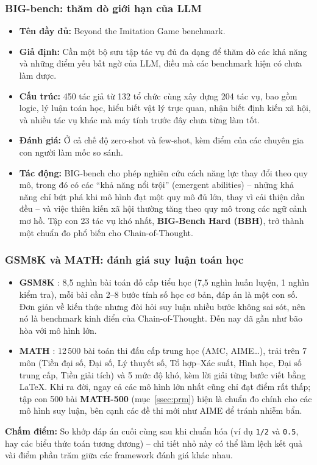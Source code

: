 \subsubsection{BIG-bench: thăm dò giới hạn của LLM}
\begin{itemize}
    \item \textbf{Tên đầy đủ:} Beyond the Imitation Game benchmark.
    \item \textbf{Giả định:} Cần một bộ sưu tập tác vụ đủ đa dạng để thăm dò các khả năng và những điểm yếu bất ngờ của LLM, điều mà các benchmark hiện có chưa làm được.
    \item \textbf{Cấu trúc:} 450 tác giả từ 132 tổ chức \cite{srivastava2023bigbench} cùng xây dựng 204 tác vụ, bao gồm logic, lý luận toán học, hiểu biết vật lý trực quan, nhận biết định kiến xã hội, và nhiều tác vụ khác mà máy tính trước đây chưa từng làm tốt.
    \item \textbf{Đánh giá:} Ở cả chế độ zero-shot và few-shot, kèm điểm của các chuyên gia con người làm mốc so sánh.
    \item \textbf{Tác động:} BIG-bench cho phép nghiên cứu cách năng lực thay đổi theo quy mô, trong đó có các “khả năng nổi trội” (emergent abilities) -- những khả năng chỉ bứt phá khi mô hình đạt một quy mô đủ lớn, thay vì cải thiện dần đều -- và việc thiên kiến xã hội thường tăng theo quy mô trong các ngữ cảnh mơ hồ. Tập con 23 tác vụ khó nhất, \textbf{BIG-Bench Hard (BBH)}, trở thành một chuẩn đo phổ biến cho Chain-of-Thought.
\end{itemize}

\subsubsection{GSM8K và MATH: đánh giá suy luận toán học}
\label{sssec:gsm8k_math}
\begin{itemize}
	\item \textbf{GSM8K} \cite{cobbe2021gsm8k}: 8{,}5 nghìn bài toán đố cấp tiểu học (7{,}5 nghìn huấn luyện, 1 nghìn kiểm tra), mỗi bài cần 2--8 bước tính số học cơ bản, đáp án là một con số. Đơn giản về kiến thức nhưng đòi hỏi suy luận nhiều bước không sai sót, nên nó là benchmark kinh điển của Chain-of-Thought. Đến nay đã gần như bão hòa với mô hình lớn.
	\item \textbf{MATH} \cite{hendrycks2021math}: 12\,500 bài toán thi đấu cấp trung học (AMC, AIME\ldots), trải trên 7 môn (Tiền đại số, Đại số, Lý thuyết số, Tổ hợp--Xác suất, Hình học, Đại số trung cấp, Tiền giải tích) và 5 mức độ khó, kèm lời giải từng bước viết bằng \LaTeX. Khi ra đời, ngay cả các mô hình lớn nhất cũng chỉ đạt điểm rất thấp; tập con 500 bài \textbf{MATH-500} (mục~\ref{ssec:prm}) hiện là chuẩn đo chính cho các mô hình suy luận, bên cạnh các đề thi mới như AIME để tránh nhiễm bẩn.
\end{itemize}
\textbf{Chấm điểm:} So khớp đáp án cuối cùng sau khi chuẩn hóa (ví dụ \texttt{1/2} và \texttt{0.5}, hay các biểu thức toán tương đương) -- chi tiết nhỏ này có thể làm lệch kết quả vài điểm phần trăm giữa các framework đánh giá khác nhau.


